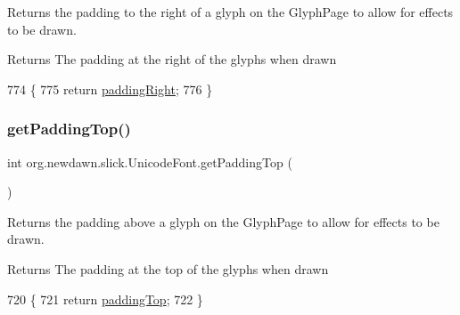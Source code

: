 Returns the padding to the right of a glyph on the Glyph\+Page to allow for effects to be drawn.

\begin{DoxyReturn}{Returns}
The padding at the right of the glyphs when drawn 
\end{DoxyReturn}

\begin{DoxyCode}
774                                   \{
775         \textcolor{keywordflow}{return} \mbox{\hyperlink{classorg_1_1newdawn_1_1slick_1_1_unicode_font_ac488d6ccaeeb1d846fb5fc796a4e4ff2}{paddingRight}};
776     \}
\end{DoxyCode}
\mbox{\label{classorg_1_1newdawn_1_1slick_1_1_unicode_font_a77eb496db108ecac650dd6b17792cd7a}} 
\subsubsection{\texorpdfstring{get\+Padding\+Top()}{getPaddingTop()}}
{\footnotesize\ttfamily int org.\+newdawn.\+slick.\+Unicode\+Font.\+get\+Padding\+Top (\begin{DoxyParamCaption}{ }\end{DoxyParamCaption})\hspace{0.3cm}{\ttfamily [inline]}}

Returns the padding above a glyph on the Glyph\+Page to allow for effects to be drawn.

\begin{DoxyReturn}{Returns}
The padding at the top of the glyphs when drawn 
\end{DoxyReturn}

\begin{DoxyCode}
720                                \{
721         \textcolor{keywordflow}{return} \mbox{\hyperlink{classorg_1_1newdawn_1_1slick_1_1_unicode_font_acadcc8c595615d077e2c0039818292f2}{paddingTop}};
722     \}
\end{DoxyCode}
\mbox{\label{classorg_1_1newdawn_1_1slick_1_1_unicode_font_ae22ad15476d281ba64344fa67da926f1}} 
